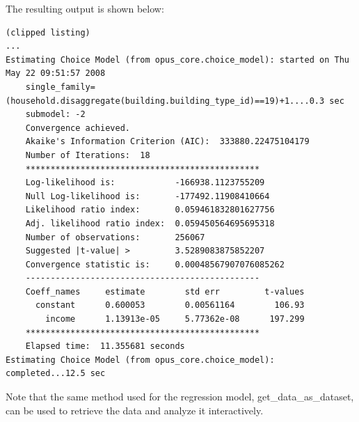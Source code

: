 The resulting output is shown below:

\begin{verbatim}
(clipped listing)
...
Estimating Choice Model (from opus_core.choice_model): started on Thu May 22 09:51:57 2008
    single_family=(household.disaggregate(building.building_type_id)==19)+1....0.3 sec
    submodel: -2
    Convergence achieved.
    Akaike's Information Criterion (AIC):  333880.22475104179
    Number of Iterations:  18
    ***********************************************
    Log-likelihood is:            -166938.1123755209
    Null Log-likelihood is:       -177492.11908410664
    Likelihood ratio index:       0.059461832801627756
    Adj. likelihood ratio index:  0.059450564695695318
    Number of observations:       256067
    Suggested |t-value| >         3.5289083875852207
    Convergence statistic is:     0.00048567907076085262
    -----------------------------------------------
    Coeff_names     estimate        std err         t-values
      constant      0.600053        0.00561164        106.93
        income      1.13913e-05     5.77362e-08      197.299
    ***********************************************
    Elapsed time:  11.355681 seconds
Estimating Choice Model (from opus_core.choice_model): completed...12.5 sec
\end{verbatim}

Note that the same method used for the regression model,
get\_data\_as\_dataset, can be used to retrieve the data and
analyze it interactively.

